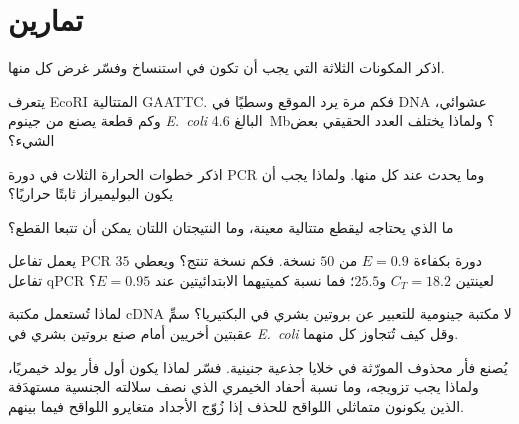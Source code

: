 \section{تمارين}

\begin{exercise}[$\star$]\label{exo:b3:genetic-engineering:1}
اذكر المكونات الثلاثة التي يجب أن تكون في  استنساخ وفسّر
غرض كل منها.
\end{exercise}

\begin{exercise}[$\star$]\label{exo:b3:genetic-engineering:2}
يتعرف EcoRI المتتالية GAATTC. فكم مرة يرد الموقع وسطيًا في
DNA عشوائي، وكم قطعة يصنع من جينوم \emph{E.~coli} البالغ
\qty{4.6}{Mb}؟ ولماذا يختلف العدد الحقيقي بعض الشيء؟
\end{exercise}

\begin{exercise}[$\star$]\label{exo:b3:genetic-engineering:3}
اذكر خطوات الحرارة الثلاث في دورة PCR وما يحدث عند
كل منها. ولماذا يجب أن يكون البوليميراز ثابتًا حراريًا؟
\end{exercise}

\begin{exercise}[$\star$]\label{exo:b3:genetic-engineering:4}
ما الذي يحتاجه  ليقطع متتالية معينة، وما النتيجتان
اللتان يمكن أن تتبعا القطع؟
\end{exercise}

\begin{exercise}[$\star\star$]\label{exo:b3:genetic-engineering:5}
يعمل تفاعل PCR $35$ دورة بكفاءة $E = 0.9$ من $50$ نسخة. فكم
نسخة تنتج؟ ويعطي تفاعل qPCR لعينتين $C_{T} = 18.2$ و$25.5$؛
فما نسبة كميتيهما الابتدائيتين عند $E = 0.95$؟
\end{exercise}

\begin{exercise}[$\star\star$]\label{exo:b3:genetic-engineering:6}
لماذا تُستعمل مكتبة cDNA لا مكتبة جينومية للتعبير عن
بروتين بشري في البكتيريا؟ سمِّ عقبتين أخريين أمام صنع بروتين
بشري في \emph{E.~coli} وقل كيف تُتجاوز كل منهما.
\end{exercise}

\begin{exercise}[$\star\star$]\label{exo:b3:genetic-engineering:7}
يُصنع فأر محذوف المورّثة  في خلايا جذعية جنينية.
فسّر لماذا يكون أول فأر يولد خيمريًا، ولماذا يجب تزويجه،
وما نسبة أحفاد الخيمري الذي نصف سلالته الجنسية مستهدَفة
الذين يكونون متماثلي اللواقح للحذف إذا زُوّج الأجداد متغايرو
اللواقح فيما بينهم.
\end{exercise}

